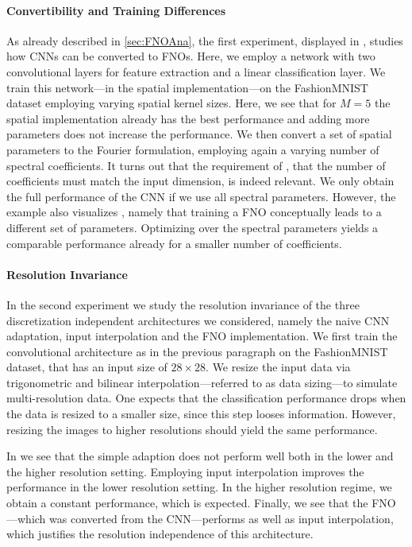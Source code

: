 \paragraph{Convertibility and Training Differences} As already described in \cref{sec:FNOAna}, the first experiment, displayed in \cite[Fig. 3]{kabri2023resolution}, studies how CNNs can be converted to FNOs. Here, we employ a network with two convolutional layers for feature extraction and a linear classification layer. We train this network---in the spatial implementation---on the FashionMNIST dataset \cite{Han17} employing varying spatial kernel sizes. Here, we see that for $M=5$ the spatial implementation already has the best performance and adding more parameters does not increase the performance. We then convert a set of spatial parameters to the Fourier formulation, employing again a varying number of spectral coefficients. It turns out that the requirement of \cite[Lem. 3]{kabri2023resolution}, that the number of coefficients must match the input dimension, is indeed relevant. We only obtain the full performance of the CNN if we use all spectral parameters. However, the example also visualizes \cite[Lem. 4]{kabri2023resolution}, namely that training a FNO conceptually leads to a different set of parameters. Optimizing over the spectral parameters yields a comparable performance already for a smaller number of coefficients.
%
%
\paragraph{Resolution Invariance}
%
In the second experiment we study the resolution invariance of the three discretization independent architectures we considered, namely the naive CNN adaptation, input interpolation and the FNO implementation. We first train the convolutional architecture as in the previous paragraph on the FashionMNIST dataset, that has an input size of $28\times 28$. We resize the input data via trigonometric and bilinear interpolation---referred to as data sizing---to simulate multi-resolution data. One expects that the classification performance drops when the data is resized to a smaller size, since this step looses information. However, resizing the images to higher resolutions should yield the same performance.

In \cite[Fig. 4]{kabri2023resolution} we see that the simple adaption does not perform well both in the lower and the higher resolution setting. Employing input interpolation improves the performance in the lower resolution setting. In the higher resolution regime, we obtain a constant performance, which is expected. Finally, we see that the FNO---which was converted from the CNN---performs as well as input interpolation, which justifies the resolution independence of this architecture.

